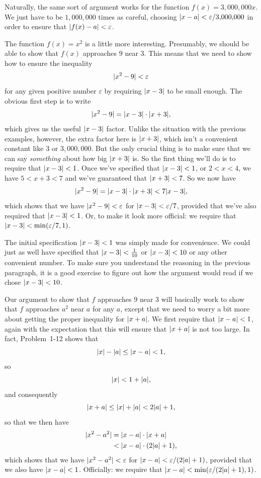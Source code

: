 Naturally, the same sort of argument works for the function
$f(x)=3{,}000{,}000x$. We just have to be $1{,}000{,}000$ times as careful,
choosing $\lvert x-a\rvert<\varepsilon/3{,}000{,}000$ in order to ensure that
$\lvert f(x)-a\rvert<\varepsilon$.

The function $f(x)=x^2$ is a little more interesting. Presumably, we should be
able to show that $f(x)$ approaches $9$ near $3$. This means that we need to
show how to ensure the inequality
\[
\lvert x^2-9\rvert<\varepsilon
\]
for any given positive number $\varepsilon$ by requiring $\lvert x-3\rvert$ to be
small enough. The obvious first step is to write
\[
\lvert x^2-9\rvert=\lvert x-3\rvert\cdot\lvert x+3\rvert,
\]
which gives us the useful $\lvert x-3\rvert$ factor. Unlike the situation with the
previous examples, however, the extra factor here is $\lvert x+3\rvert$, which isn't
a convenient constant like $3$ or $3{,}000{,}000$. But the only crucial thing
is to make sure that we can say \emph{something} about how big $\lvert x+3\rvert$ is.
So the first thing we'll do is to require that $\lvert x-3\rvert<1$. Once we've
specified that $\lvert x-3\rvert<1$, or $2<x<4$, we have $5<x+3<7$ and we've
guaranteed that $\lvert x+3\rvert<7$. So we now have
\[
\lvert x^2-9\rvert=\lvert x-3\rvert\cdot\lvert x+3\rvert<7\lvert x-3\rvert,
\]
which shows that we have $\lvert x^2-9\rvert<\varepsilon$ for
$\lvert x-3\rvert<\varepsilon/7$, provided that we've also required that
$\lvert x-3\rvert<1$. Or, to make it look more official: we require that
$\lvert x-3\rvert<\min(\varepsilon/7,1)$.

The initial specification $\lvert x-3\rvert<1$ was simply made for convenience. We
could just as well have specified that $\lvert x-3\rvert<\frac{1}{10}$ or
$\lvert x-3\rvert<10$ or any other convenient number. To make sure you understand the
reasoning in the previous paragraph, it is a good exercise to figure out how
the argument would read if we chose $\lvert x-3\rvert<10$.

Our argument to show that $f$ approaches $9$ near $3$ will basically work to
show that $f$ approaches $a^2$ near $a$ for any $a$, except that we need to
worry a bit more about getting the proper inequality for $\lvert x+a\rvert$. We first
require that $\lvert x-a\rvert<1$, again with the expectation that this will ensure
that $\lvert x+a\rvert$ is not too large. In fact, Problem~1-12 shows that
\[
\lvert x\rvert-\lvert a\rvert\leq\lvert x-a\rvert<1,
\]
so
\[
\lvert x\rvert<1+\lvert a\rvert,
\]
and consequently
\[
\lvert x+a\rvert\leq\lvert x\rvert+\lvert a\rvert<2\lvert a\rvert+1,
\]
so that we then have
\begin{align*}
\lvert x^2-a^2\rvert&=\lvert x-a\rvert\cdot\lvert x+a\rvert\\
&<\lvert x-a\rvert\cdot(2\lvert a\rvert+1),
\end{align*}
which shows that we have $\lvert x^2-a^2\rvert<\varepsilon$ for
$\lvert x-a\rvert<\varepsilon/(2\lvert a\rvert+1)$, provided that we also have
$\lvert x-a\rvert<1$. Officially: we require that
$\lvert x-a\rvert<\min(\varepsilon/(2\lvert a\rvert+1),1)$.

